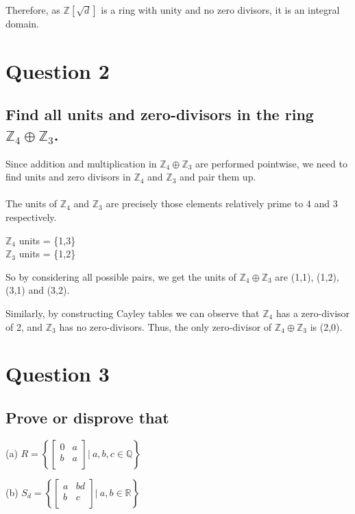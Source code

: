 \documentclass{article}
\begin{document}
Therefore, as \(\mathds{Z}[\sqrt{d}]\) is a ring with unity and no zero divisors, it is an integral domain.
\section*{Question 2}
\subsection*{Find all units and zero-divisors in the ring \(\mathds{Z}_4 \oplus \mathds{Z}_3\).}

\solution
Since addition and multiplication in \(\mathds{Z}_4 \oplus \mathds{Z}_3\) are performed pointwise, we need to find units and zero divisors in \(\mathds{Z}_4\) and \(\mathds{Z}_3\) and pair them up.
\\\\
The units of \(\mathds{Z}_4\) and \(\mathds{Z}_3\) are precisely those elements relatively prime to 4 and 3 respectively.

\hspace* \(\mathds{Z}_4\) units = \{1,3\}\\
\hspace* \(\mathds{Z}_3\) units = \{1,2\}

So by considering all possible pairs, we get the units of \(\mathds{Z}_4 \oplus \mathds{Z}_3\) are (1,1), (1,2), (3,1) and (3,2).

Similarly, by constructing Cayley tables we can observe that \(\mathds{Z}_4\) has a zero-divisor of 2, and \(\mathds{Z}_3\) has no zero-divisors. Thus, the only zero-divisor of \(\mathds{Z}_4 \oplus \mathds{Z}_3\) is (2,0).

\pagebreak
\section*{Question 3}
\subsection*{Prove or disprove that}

(a) \(R = \left\{
  \left[ {\begin{array}{cc}
   0 & a \\
   b & a \\
  \end{array} } \right] \rvert\: a,b,c \in \mathds{Q} \right\}
\)

(b) \(S_d = \left\{
  \left[ {\begin{array}{cc}
   a & bd \\
   b & c \\
  \end{array} } \right] \rvert\: a,b \in \mathds{R} \right\}
\)
\end{document}
